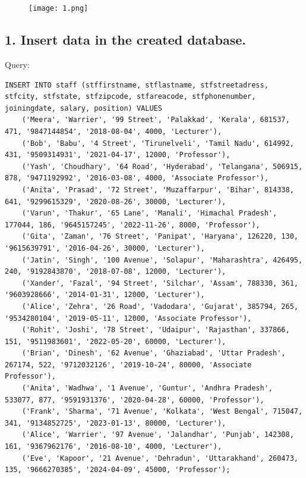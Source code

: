 \documentclass{article}
\begin{document}
\section*{}
\begin{figure}[h!]
    \centering
    \texttt{[image: 1.png]} %
    \label{fig:schema}
\end{figure}
\subsection*{1. Insert data in the created database.}
Query:
\begin{Verbatim}[frame=single,framerule=1pt,fontfamily=courier,fontsize=\small]
INSERT INTO staff (stffirstname, stflastname, stfstreetadress, stfcity, stfstate, stfzipcode, stfareacode, stfphonenumber, joiningdate, salary, position) VALUES
    ('Meera', 'Warrier', '99 Street', 'Palakkad', 'Kerala', 681537, 471, '9847144854', '2018-08-04', 4000, 'Lecturer'),
    ('Bob', 'Babu', '4 Street', 'Tirunelveli', 'Tamil Nadu', 614992, 431, '9509314931', '2021-04-17', 12000, 'Professor'),
    ('Yash', 'Choudhary', '64 Road', 'Hyderabad', 'Telangana', 506915, 878, '9471192992', '2016-03-08', 4000, 'Associate Professor'),
    ('Anita', 'Prasad', '72 Street', 'Muzaffarpur', 'Bihar', 814338, 641, '9299615329', '2020-08-26', 30000, 'Lecturer'),
    ('Varun', 'Thakur', '65 Lane', 'Manali', 'Himachal Pradesh', 177044, 186, '9645157245', '2022-11-26', 8000, 'Professor'),
    ('Gita', 'Zaman', '76 Street', 'Panipat', 'Haryana', 126220, 130, '9615639791', '2016-04-26', 30000, 'Lecturer'),
    ('Jatin', 'Singh', '100 Avenue', 'Solapur', 'Maharashtra', 426495, 240, '9192843870', '2018-07-08', 12000, 'Lecturer'),
    ('Xander', 'Fazal', '94 Street', 'Silchar', 'Assam', 788330, 361, '9603928666', '2014-01-31', 12000, 'Lecturer'),
    ('Alice', 'Zehra', '26 Road', 'Vadodara', 'Gujarat', 385794, 265, '9534280104', '2019-05-11', 12000, 'Associate Professor'),
    ('Rohit', 'Joshi', '78 Street', 'Udaipur', 'Rajasthan', 337866, 151, '9511983601', '2022-05-20', 60000, 'Lecturer'),
    ('Brian', 'Dinesh', '62 Avenue', 'Ghaziabad', 'Uttar Pradesh', 267174, 522, '9712032126', '2019-10-24', 80000, 'Associate Professor'),
    ('Anita', 'Wadhwa', '1 Avenue', 'Guntur', 'Andhra Pradesh', 533077, 877, '9591931376', '2020-04-28', 60000, 'Professor'),
    ('Frank', 'Sharma', '71 Avenue', 'Kolkata', 'West Bengal', 715047, 341, '9134852725', '2023-01-13', 80000, 'Lecturer'),
    ('Alice', 'Warrier', '97 Avenue', 'Jalandhar', 'Punjab', 142308, 161, '9367962176', '2016-08-10', 4000, 'Lecturer'),
    ('Eve', 'Kapoor', '21 Avenue', 'Dehradun', 'Uttarakhand', 260473, 135, '9666270385', '2024-04-09', 45000, 'Professor');


\end{Verbatim}
\end{document}

